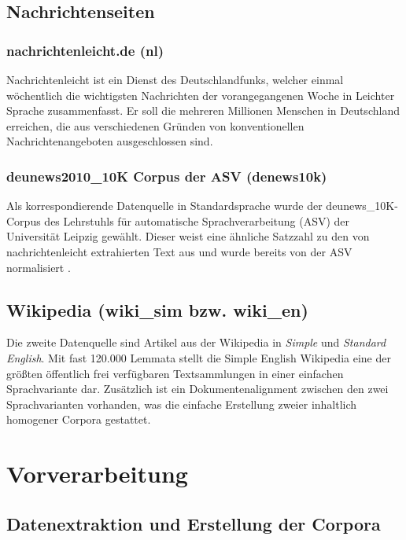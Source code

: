 \documentclass[11pt, a4paper]{article}
\begin{document}
\subsection{Nachrichtenseiten}
\label{nrseiten}

\subsubsection{nachrichtenleicht.de (nl)}

Nachrichtenleicht ist ein Dienst des Deutschlandfunks, welcher einmal
w\"ochentlich die wichtigsten Nachrichten der vorangegangenen Woche in Leichter
Sprache zusammenfasst. Er soll die mehreren Millionen Menschen in Deutschland
erreichen, die aus verschiedenen Gr\"unden von konventionellen
Nachrichtenangeboten ausgeschlossen sind.

\subsubsection{deunews2010\_10K Corpus der ASV (denews10k)}

Als korrespondierende Datenquelle in Standardsprache wurde der
deunews\_10K-Corpus des Lehrstuhls f\"ur automatische Sprachverarbeitung
(ASV) der Universit\"at Leipzig gew\"ahlt. Dieser weist eine \"ahnliche Satzzahl
zu den von nachrichtenleicht extrahierten Text aus und wurde bereits von der ASV
normalisiert \cite{Quasthoff2006}.

\subsection{Wikipedia (wiki\_sim bzw. wiki\_en)}
\label{corp-wiki}
Die zweite Datenquelle sind Artikel aus der Wikipedia in \emph{Simple} und
\emph{Standard English}. Mit fast 120.000 Lemmata stellt die Simple English
Wikipedia eine der gr\"o\ss{}ten \"offentlich frei verf\"ugbaren Textsammlungen
in einer einfachen Sprachvariante dar.
Zus\"atzlich ist ein Dokumentenalignment zwischen den zwei Sprachvarianten
vorhanden, was die einfache Erstellung zweier inhaltlich homogener Corpora
gestattet.


\section{Vorverarbeitung}

\subsection{Datenextraktion und Erstellung der Corpora}
\label{datextr}
\end{document}
